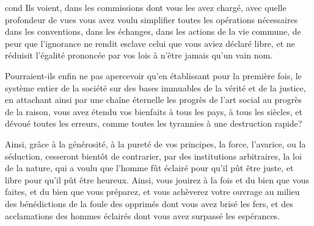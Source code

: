 \begin{displaycquote}[509-511]{cond}
  Ils voient, dans les commissions dont vous les avez chargé, avec
  quelle profondeur de vues vous avez voulu simplifier toutes les
  opérations nécessaires dans les conventions, dans les échanges, dans
  les actions de la vie commune, de peur que l'ignorance ne rendit
  esclave celui que vous aviez déclaré libre, et ne réduisit l'égalité
  prononcée par vos lois à n'être jamais qu'un vain nom.

  Pourraient-ils enfin ne pas apercevoir qu'en établissant pour la
  première fois, le système entier de la société sur des bases
  immuables de la vérité et de la justice, en attachant ainsi par une
  chaîne éternelle les progrès de l'art social au progrès de la
  raison, vous avez étendu vos bienfaits à tous les pays, à tous les
  siècles, et dévoué toutes les erreurs, comme toutes les tyrannies à
  une destruction rapide?

  Ainsi, grâce à la générosité, à la pureté de vos principes, la
  force, l'avarice, ou la séduction, cesseront bientôt de contrarier,
  par des institutions arbitraires, la loi de la nature, qui a voulu
  que l'homme fût éclairé pour qu'il pût être juste, et libre pour
  qu'il pût être heureux. Ainsi, vous jouirez à la fois et du bien que
  vous faites, et du bien que vous préparez, et vous achèverez votre
  ouvrage au milieu des bénédictions de la foule des opprimés dont
  vous avez brisé les fers, et des acclamations des hommes éclairés
  dont vous avez surpassé les espérances.
\end{displaycquote}


